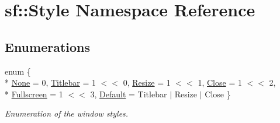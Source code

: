 \hypertarget{namespacesf_1_1_style}{\section{sf\-:\-:Style Namespace Reference}
\label{namespacesf_1_1_style}
}
\subsection*{Enumerations}
\begin{DoxyCompactItemize}
\item 
enum \{ \\*
\hyperlink{group__window_ggae1db07091f9745bd223882ba55e7fae2a8c35a9c8507559e455387fc4a83ce422}{None} = 0, 
\hyperlink{group__window_ggae1db07091f9745bd223882ba55e7fae2ab4c8b32b05ed715928513787cb1e85b6}{Titlebar} = 1 $<$$<$ 0, 
\hyperlink{group__window_ggae1db07091f9745bd223882ba55e7fae2accff967648ebcd5db2007eff7352b50f}{Resize} = 1 $<$$<$ 1, 
\hyperlink{group__window_ggae1db07091f9745bd223882ba55e7fae2ae07a7d411d5acf28f4a9a4b76a3a9493}{Close} = 1 $<$$<$ 2, 
\\*
\hyperlink{group__window_ggae1db07091f9745bd223882ba55e7fae2a6288ec86830245cf957e2d234f79f50d}{Fullscreen} = 1 $<$$<$ 3, 
\hyperlink{group__window_ggae1db07091f9745bd223882ba55e7fae2a5597cd420fc461807e4a201c92adea37}{Default} = Titlebar $|$ Resize $|$ Close
 \}
\begin{DoxyCompactList}\small\item\em Enumeration of the window styles. \end{DoxyCompactList}\end{DoxyCompactItemize}
